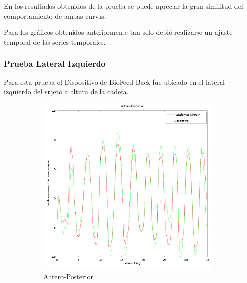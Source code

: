 \documentclass[12pt,a4paper]{article}
\newcommand{\nombreDispositivo}{Dispositivo de BioFeed-Back }
\begin{document}
	En los resultados obtenidos de la prueba se puede apreciar la gran similitud del comportamiento de ambas curvas.
	
	Para los gráficos obtenidos anteriormente tan solo debió realizarse un ajuste temporal de las series temporales.



\newpage
\subsubsection{Prueba Lateral Izquierdo}
	Para esta prueba el \nombreDispositivo fue ubicado en el lateral izquierdo del sujeto a altura de la cadera.
		
	\begin{figure}[H]
		\centering
		\begin{subfigure}{.5\textwidth}
			\centering
			\includegraphics[width=1\linewidth]{images/pruebas/LateralIzquierdo/Antero-Posterior}
			\caption{Antero-Posterior}
			\label{fig:anteroPosteriorLateral}
		\end{subfigure}%
		\begin{subfigure}{.5\textwidth}
			\centering

\end{subfigure}
\end{figure}
\end{document}
